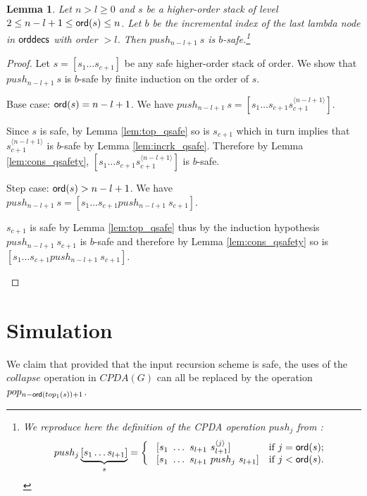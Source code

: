\documentclass{article}
\newtheorem{lemma}{Lemma}[section]
\theoremstyle{remark}
\theoremstyle{definition}
\newcommand\orddec{\sf orddec}
\begin{document}
\begin{lemma}
\label{lem:pushj_safe_implies_b-safe} Let $n>l\geq 0$ and $s$ be a higher-order stack
of level $2 \leq n-l+1 \leq {\sf ord}(s) \leq n$. Let $b$ be the incremental index of the last lambda node in $\orddec{s}$ with order $>l$. Then $push_{n-l+1}\ s$ is $b$-safe.\footnote{We reproduce here the definition of the
CPDA operation $push_j$ from \cite{hague-sto07}:
$$ push_j \underbrace{[ s_1 \ldots s_{l+1} ]}_{s} =
\left\{
  \begin{array}{ll}
\    [s_1\ \ldots\ s_{l+1}\ s_{l+1}^{\langle j \rangle}]  &\hbox{if $j = {\sf ord}(s)$;}\\
\    [s_1\ \ldots\ s_{l+1}\ push_j\ s_{l+1}]  &\hbox{if $j<{\sf ord}(s)$.}
 \end{array}
\right.
$$}
\end{lemma}
\begin{proof}
Let $s=[s_1 \ldots s_{c+1}]$ be any safe higher-order stack of order. We show that $push_{n-l+1}~s$ is $b$-safe by finite induction on the order of $s$.
    \begin{compactitem}
      \item Base case: ${\sf ord}(s) = n-l+1 $. We have
    $push_{n-l+1}~s = [ s_1 \ldots s_{c+1} s_{c+1}^{\langle n-l+1
    \rangle}]$.

    Since $s$ is safe, by Lemma \ref{lem:top_qsafe} so is $s_{c+1}$
    which in turn implies that $s_{c+1}^{\langle n-l+1\rangle}$ is
    $b$-safe by Lemma \ref{lem:incrk_qsafe}. Therefore by Lemma
    \ref{lem:cons_qsafety},  $[ s_1 \ldots s_{c+1} s_{c+1}^{\langle n-l+1
    \rangle}]$ is $b$-safe.

      \item Step case: ${\sf ord}(s) > n-l+1$. We have
    $push_{n-l+1}~s = [ s_1 \ldots s_{c+1} push_{n-l+1}~s_{c+1}]$.

    $s_{c+1}$ is safe by Lemma \ref{lem:top_qsafe} thus by the
    induction hypothesis $push_{n-l+1}~s_{c+1}$ is $b$-safe and therefore by Lemma \ref{lem:cons_qsafety} so
    is $[ s_1 \ldots s_{c+1} push_{n-l+1}~s_{c+1}]$.
    \end{compactitem}
\end{proof}





\section{Simulation}

We claim that provided that the input recursion scheme is safe, the
uses of the $collapse$ operation in $CPDA(G)$ can all be replaced by the operation $pop_{n-{\sf ord}(top_1(s))+1}$.
\end{document}
